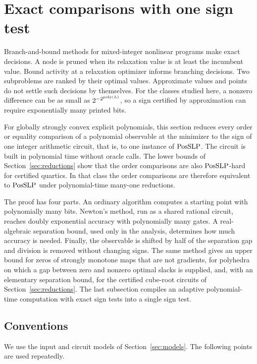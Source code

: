 \section{Exact comparisons with one sign test}
\label{sec:upper}

Branch-and-bound methods for mixed-integer nonlinear programs make exact
decisions. A node is pruned when its relaxation value is at least the
incumbent value. Bound activity at a relaxation optimizer informs branching
decisions. Two subproblems are ranked by their optimal values. Approximate
values and points do not settle such decisions by themselves. For the
classes studied here, a nonzero difference can be as small as
$2^{-2^{\operatorname{poly}(L)}}$, so a sign certified by approximation can require
exponentially many printed bits.

For globally strongly convex explicit polynomials, this section reduces every
order or equality comparison of a polynomial observable at the minimizer to
the sign of one integer arithmetic circuit, that is, to one instance of
$\mathrm{PosSLP}$. The circuit is built in polynomial time without oracle calls. The lower bounds of
Section~\ref{sec:reductions} show that the order comparisons are also
$\mathrm{PosSLP}$-hard for certified quartics. In that class the order comparisons
are therefore equivalent to $\mathrm{PosSLP}$ under polynomial-time many-one
reductions.

The proof has four parts. An ordinary algorithm computes a starting point
with polynomially many bits. Newton's method, run as a shared rational
circuit, reaches doubly exponential accuracy with polynomially many gates. A
real-algebraic separation bound, used only in the analysis, determines how
much accuracy is needed. Finally, the observable is shifted by half of the
separation gap and division is removed without changing signs. The same
method gives an upper bound for zeros of strongly monotone maps that are not
gradients, for polyhedra on which a gap between zero and nonzero optimal
slacks is supplied, and, with an elementary separation bound, for the
certified cube-root circuits of Section~\ref{sec:reductions}. The last
subsection compiles an adaptive polynomial-time computation with exact sign
tests into a single sign test.

\subsection{Conventions}
\label{sec:upper-conventions}

We use the input and circuit models of Section~\ref{sec:models}. The
following points are used repeatedly.

